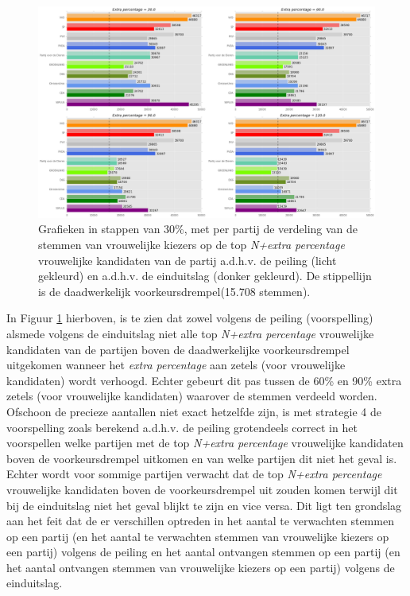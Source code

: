   
\begin{figure}[H]

	\includegraphics[width=\linewidth]	{stemmen_op_vrouwen_topNextrapercentage_samen.png}

			\caption{Grafieken in stappen van 30\%, met per partij de verdeling van de stemmen van vrouwelijke kiezers op de top \textit{N+extra percentage} vrouwelijke kandidaten van de partij a.d.h.v. de peiling (licht gekleurd) en a.d.h.v. de einduitslag (donker gekleurd). De stippellijn is de daadwerkelijk voorkeursdrempel(15.708 stemmen).}

\label{fig:stemmenS4V}
\end{figure}

In Figuur \ref{fig:stemmenS4V} hierboven, is te zien dat zowel volgens de peiling (voorspelling) alsmede volgens de einduitslag niet alle top \textit{N+extra percentage} vrouwelijke kandidaten van de partijen boven de daadwerkelijke voorkeursdrempel uitgekomen wanneer het \textit{extra percentage} aan zetels (voor vrouwelijke kandidaten) wordt verhoogd. Echter gebeurt dit pas tussen de 60\%  en 90\% extra zetels (voor vrouwelijke kandidaten) waarover de stemmen verdeeld worden. Ofschoon de precieze aantallen niet exact hetzelfde zijn, is met strategie 4 de voorspelling zoals berekend a.d.h.v. de peiling grotendeels correct in het voorspellen welke partijen met de top \textit{N+extra percentage} vrouwelijke kandidaten boven de voorkeursdrempel uitkomen en van welke partijen dit niet het geval is. Echter wordt voor sommige partijen verwacht dat de top \textit{N+extra percentage} vrouwelijke kandidaten boven de voorkeursdrempel uit zouden komen terwijl dit bij de einduitslag niet het geval blijkt te zijn en vice versa. Dit ligt ten grondslag aan het feit dat de er verschillen optreden in het aantal te verwachten stemmen op een partij (en het aantal te verwachten stemmen van vrouwelijke kiezers op een partij) volgens de peiling en het aantal ontvangen stemmen op een partij (en het aantal ontvangen stemmen van vrouwelijke kiezers op een partij) volgens de einduitslag.



